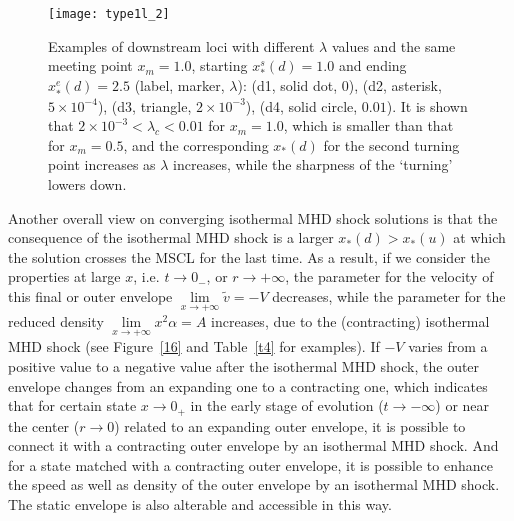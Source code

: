 \documentclass[fleqn,usenatbib]{mnras}
\begin{document}
\begin{figure}
\centering
\texttt{[image: type1l\_2]}
\caption{Examples of downstream loci with different $\lambda$ values and the same meeting point $x_{m}=1.0$, starting $x_{*}^{s}(d)=1.0$ and ending $x_{*}^{e}(d)=2.5$ (label, marker, $\lambda$): (d1, solid dot, 0), (d2, asterisk, $5\times 10^{-4}$), (d3, triangle, $2\times 10^{-3}$), (d4, solid circle, $0.01$). It is shown that $2\times 10^{-3}<\lambda_{c}<0.01$ for $x_{m}=1.0$, which  is smaller than that for $x_{m}=0.5$, and the corresponding $x_{*}(d)$ for the second turning point increases as $\lambda$ increases, while the sharpness of the `turning' lowers down.}
\label{lc4}
\end{figure}

Another overall view on converging isothermal MHD shock solutions is that the consequence of the isothermal MHD shock is a larger $x_{*}(d)>x_{*}(u)$ at which the solution crosses the MSCL for the last time. As a result, if we consider the properties at large $x$, i.e. $t\rightarrow 0_{-}$, or $r\rightarrow +\infty$, the parameter for the velocity of this final or outer envelope $\lim\limits_{x\rightarrow +\infty}\widetilde{v}=-V$ decreases, while the parameter for the reduced density $\lim\limits_{x\rightarrow +\infty}x^{2}\alpha=A$ increases, due to the (contracting) isothermal MHD shock (see Figure~\ref{16} and Table~\ref{t4} for examples). If $-V$ varies from a positive value to a negative value after the isothermal MHD shock, the outer envelope changes from an expanding one to a contracting one, which indicates that for certain state $x\rightarrow 0_{+}$ in the early stage of evolution ($t\rightarrow -\infty$) or near the center ($r\rightarrow 0$) related to an expanding outer envelope, it is possible to connect it with a contracting outer envelope by an isothermal MHD shock. And for a state matched with a contracting outer envelope, it is possible to enhance the speed as well as density of the outer envelope by an isothermal MHD shock. The static envelope is also alterable and accessible in this way. 

\end{document}
